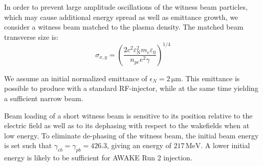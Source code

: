 \documentclass[aps,prstab,reprint,amsmath,amssymb,groupedaddress,onecolumn]{revtex4-1}
\newcommand{\unit}[1]{\,\mathrm{#1}}
\begin{document}
In order to prevent large amplitude oscillations %
of the witness beam particles, which may cause additional energy spread as well as emittance growth, we %
consider a witness beam matched to the plasma density.  
The matched beam transverse size is:
\begin{equation}
	\sigma_{x,y}=\left(\frac{2c^{2}\varepsilon_{\mathrm{\mathrm{N}}}^{2}m_{e}\varepsilon_{0}}{n_{pe}e^{2}\gamma}\right)^{1/4}  \label{EQ:MatchedR}  %
\end{equation}

We %
assume an initial normalized emittance of $\epsilon_{N} = 2\unit{\mu m}$. This emittance is possible to produce with a standard RF-injector, while at the same time yielding a sufficient narrow beam. %

Beam loading of a short witness beam is sensitive to its position relative to the electric field \cite{tzoufras:2009} %
as well as to its dephasing with respect to the wakefields when at low energy.
To eliminate %
de-phasing of the witness beam, %
the initial beam energy %
is set such
that $\gamma_{eb} = \gamma_{pb} = 426.3$, giving an energy of $217\unit{MeV}$.  A lower initial energy is likely to be
sufficient for AWAKE Run 2 injection. 
\end{document}
